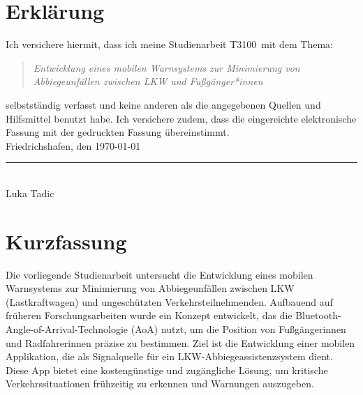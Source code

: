 \documentclass[a4paper, 12pt]{article} %
\newcommand{\titel}{Entwicklung eines mobilen Warnsystems zur Minimierung von Abbiegeunfällen zwischen LKW und Fußgänger*innen}
\newcommand{\arbeit}{Studienarbeit T3100}
\newcommand{\autor}{Luka Tadic}
\begin{document}
\begin{titlepage}
\end{titlepage}

\clearpage

\pagestyle{scrheadings}  %
\hypersetup{pageanchor=true}



\section*{Erklärung}
\begin{spacing}{1.8}  %
    \fontsize{14pt}{15pt}\selectfont  %

Ich versichere hiermit, dass ich meine \arbeit\ mit dem Thema:

\begin{quote}
    \textit{\titel}
\end{quote}

selbstständig verfasst und keine anderen als die angegebenen Quellen und Hilfsmittel benutzt habe.  
Ich versichere zudem, dass die eingereichte elektronische Fassung mit der gedruckten Fassung übereinstimmt.\\[6ex]

Friedrichshafen, den \today \\[1ex]
\rule[-0.2cm]{5cm}{0.5pt} \\  
\autor \\[10ex]

\rmfamily

\end{spacing}

\clearpage

\section*{Kurzfassung}
    Die vorliegende Studienarbeit untersucht die Entwicklung eines mobilen Warnsystems zur Minimierung von Abbiegeunfällen zwischen LKW (Lastkraftwagen) und ungeschützten Verkehrsteilnehmenden. Aufbauend auf früheren Forschungsarbeiten wurde ein Konzept entwickelt, das die
    Bluetooth-Angle-of-Arrival-Technologie (AoA) nutzt, um die Position 
    von Fußgängerinnen und Radfahrerinnen präzise zu bestimmen. Ziel ist
     die Entwicklung einer mobilen Applikation, die als Signalquelle für
      ein LKW-Abbiegeassistenzsystem dient. Diese App bietet eine 
      kostengünstige und zugängliche Lösung, um kritische 
      Verkehrssituationen frühzeitig zu erkennen und Warnungen auszugeben.
\end{document}
